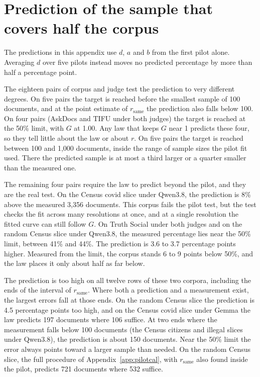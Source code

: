 \section{Prediction of the sample that covers half the corpus}
\label{app:halfcover}

The predictions in this appendix use $d$, $a$ and $b$ from the first pilot alone. Averaging $d$ over five pilots instead moves no predicted percentage by more than half a percentage point.

The eighteen pairs of corpus and judge test the prediction to very different degrees. On five pairs the target is reached before the smallest sample of 100 documents, and at the point estimate of $r_{\mathrm{same}}$ the prediction also falls below 100. On four pairs (AskDocs and TIFU under both judges) the target is reached at the 50\% limit, with $G$ at 1.00. Any law that keeps $G$ near 1 predicts these four, so they tell little about the law or about $r$. On five pairs the target is reached between 100 and 1{,}000 documents, inside the range of sample sizes the pilot fit used. There the predicted sample is at most a third larger or a quarter smaller than the measured one.

The remaining four pairs require the law to predict beyond the pilot, and they are the real test. On the Census covid slice under Qwen3.8, the prediction is 8\% above the measured 3{,}356 documents. This corpus fails the pilot test, but the test checks the fit across many resolutions at once, and at a single resolution the fitted curve can still follow $G$. On Truth Social under both judges and on the random Census slice under Qwen3.8, the measured percentage lies near the 50\% limit, between 41\% and 44\%. The prediction is 3.6 to 3.7 percentage points higher. Measured from the limit, the corpus stands 6 to 9 points below 50\%, and the law places it only about half as far below.

The prediction is too high on all twelve rows of these two corpora, including the ends of the interval of $r_{\mathrm{same}}$. Where both a prediction and a measurement exist, the largest errors fall at those ends. On the random Census slice the prediction is 4.5 percentage points too high, and on the Census covid slice under Gemma the law predicts 197 documents where 106 suffice. At two ends where the measurement falls below 100 documents (the Census citizens and illegal slices under Qwen3.8), the prediction is about 150 documents. Near the 50\% limit the error always points toward a larger sample than needed. On the random Census slice, the full procedure of Appendix~\ref{app:pilotcal}, with $r_{\mathrm{same}}$ also found inside the pilot, predicts 721 documents where 532 suffice.

